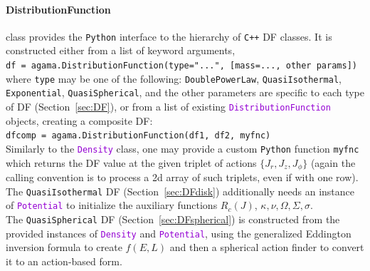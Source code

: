 \documentclass[12pt]{article}
\newcommand{\Cpp}  {\texttt{C++}\xspace}
\newcommand{\Python}{\texttt{Python}\xspace}
\newcommand{\ttt}[1]{\textcolor{darkviolet}{\texttt{#1}}}
\newcommand{\ppp}[1]{\textcolor{darkolive} {\texttt{#1}}}
\begin{document}
\paragraph{DistributionFunction} class provides the \Python interface to the hierarchy of \Cpp DF classes. It is constructed either from a list of keyword arguments,\\[1mm]
\texttt{df = agama.DistributionFunction(type="...", [mass=..., other params])}\\[1mm]
where \ppp{type} may be one of the following: \ppp{DoublePowerLaw}, \ppp{QuasiIsothermal}, \ppp{Exponential}, \ppp{QuasiSpherical}, and the other parameters are specific to each type of DF (Section~\ref{sec:DF}),
or from a list of existing \ttt{DistributionFunction} objects, creating a composite DF:\\[1mm]
\texttt{dfcomp = agama.DistributionFunction(df1, df2, myfnc)}
\\[2mm]
Similarly to the \ttt{Density} class, one may provide a custom \Python function \texttt{myfnc} which returns the DF value at the given triplet of actions $\{J_r,J_z,J_\phi\}$ (again the calling convention is to process a 2d array of such triplets, even if with one row).
\\[2mm]
The \ppp{QuasiIsothermal} DF (Section~\ref{sec:DFdisk}) additionally needs an instance of \ttt{Potential} to initialize the auxiliary functions $R_c(J)$, $\kappa,\nu,\Omega,\Sigma,\sigma$.
\\[2mm]
The \ppp{QuasiSpherical} DF (Section~\ref{sec:DFspherical}) is constructed from the provided instances of \ttt{Density} and \ttt{Potential}, using the generalized Eddington inversion formula to create $f(E,L)$ and then a spherical action finder to convert it to an action-based form.
\end{document}
